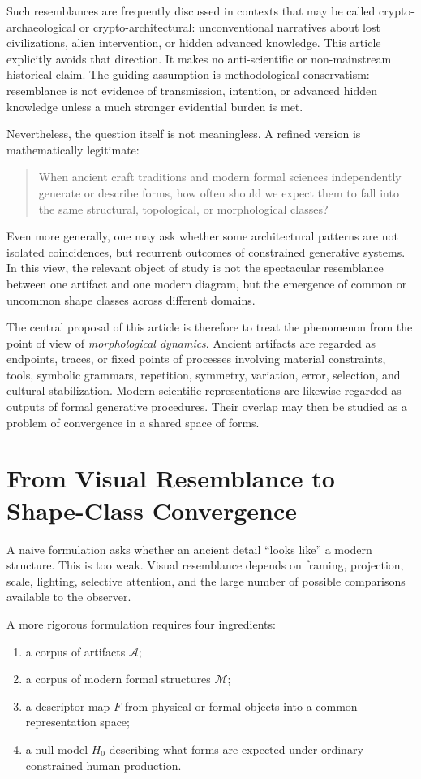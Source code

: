 \documentclass[11pt,a4paper]{article}
\begin{document}
Such resemblances are frequently discussed in contexts that may be called crypto-archaeological or crypto-architectural: unconventional narratives about lost civilizations, alien intervention, or hidden advanced knowledge. This article explicitly avoids that direction. It makes no anti-scientific or non-mainstream historical claim. The guiding assumption is methodological conservatism: resemblance is not evidence of transmission, intention, or advanced hidden knowledge unless a much stronger evidential burden is met.

Nevertheless, the question itself is not meaningless. A refined version is mathematically legitimate:
\begin{quote}
When ancient craft traditions and modern formal sciences independently generate or describe forms, how often should we expect them to fall into the same structural, topological, or morphological classes?
\end{quote}

Even more generally, one may ask whether some architectural patterns are not isolated coincidences, but recurrent outcomes of constrained generative systems. In this view, the relevant object of study is not the spectacular resemblance between one artifact and one modern diagram, but the emergence of common or uncommon shape classes across different domains.

The central proposal of this article is therefore to treat the phenomenon from the point of view of \emph{morphological dynamics}. Ancient artifacts are regarded as endpoints, traces, or fixed points of processes involving material constraints, tools, symbolic grammars, repetition, symmetry, variation, error, selection, and cultural stabilization. Modern scientific representations are likewise regarded as outputs of formal generative procedures. Their overlap may then be studied as a problem of convergence in a shared space of forms.

\section{From Visual Resemblance to Shape-Class Convergence}

A naive formulation asks whether an ancient detail ``looks like'' a modern structure. This is too weak. Visual resemblance depends on framing, projection, scale, lighting, selective attention, and the large number of possible comparisons available to the observer.

A more rigorous formulation requires four ingredients:
\begin{enumerate}[label=(\roman*)]
    \item a corpus of artifacts $\mathcal{A}$;
    \item a corpus of modern formal structures $\mathcal{M}$;
    \item a descriptor map $F$ from physical or formal objects into a common representation space;
    \item a null model $H_0$ describing what forms are expected under ordinary constrained human production.
\end{enumerate}
\end{document}
